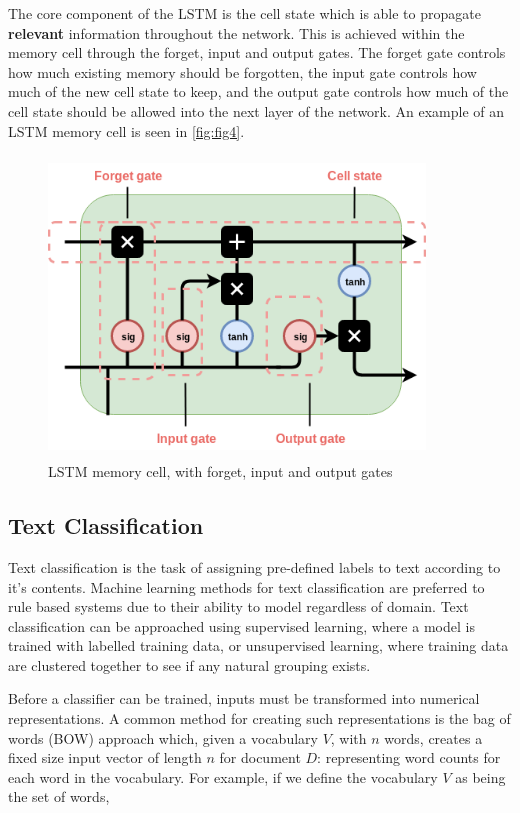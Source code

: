 \noindent
\newline
The core component of the LSTM is the cell state which is able to propagate \textbf{relevant} information throughout the network. This is achieved within the memory cell through the forget, input and output gates. The forget gate controls how much existing memory should be forgotten, the input gate controls how much of the new cell state to keep, and the output gate controls how much of the cell state should be allowed into the next layer of the network. An example of an LSTM memory cell is seen in \autoref{fig:fig4}.

\begin{figure}[ht]
	\includegraphics[width=10cm, height=8cm]{./figures/fig4}
	\centering
	\caption{LSTM memory cell, with forget, input and output gates}
	\label{fig:fig4}
\end{figure}

\subsection{Text Classification}
Text classification is the task of assigning pre-defined labels to text according to it's contents. Machine learning methods for text classification are preferred to rule based systems due to their ability to model regardless of domain. Text classification can be approached using supervised learning, where a model is trained with labelled training data, or unsupervised learning, where training data are clustered together to see if any natural grouping exists.

\noindent
\newline
Before a classifier can be trained, inputs must be transformed into numerical representations. A common method for creating such representations is the bag of words (BOW) approach which, given a vocabulary \(V\), with \(n\) words, creates a fixed size input vector of length \(n\) for document \(D\): representing word counts for each word in the vocabulary. For example, if we define the vocabulary \(V\) as being the set of words,

